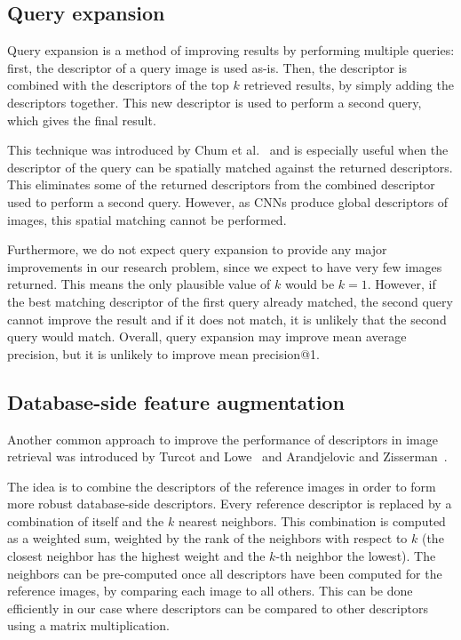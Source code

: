 \subsection{Query expansion}
Query expansion is a method of improving results by performing
multiple queries: first, the
descriptor of a query image is used as-is. Then, the descriptor
is combined with the descriptors of the top $k$ retrieved
results, by simply adding the descriptors together. This new
descriptor is used to perform a second query, which gives
the final result.

This technique was introduced by
Chum et al.~\cite{chum_total_2007} and is especially useful
when the descriptor of the query can be spatially matched
against the returned descriptors. This eliminates some of the
returned descriptors from the combined descriptor used
to perform a second query. However, as CNNs produce
global descriptors of images, this spatial matching cannot
be performed.

Furthermore, we do not expect query expansion to provide
any major improvements in our research problem, since
we expect to have very few images returned. This means
the only plausible value of $k$ would be $k=1$. However,
if the best matching descriptor of the first query already
matched, the second query cannot improve the result
and if it does not match, it is unlikely that the second
query would match. Overall, query expansion may
improve mean average precision, but it is unlikely to
improve mean precision@1.

\subsection{Database-side feature augmentation}
Another common approach to improve the performance of descriptors
in image retrieval was introduced
by Turcot and Lowe~\cite{turcot_better_2009} and
Arandjelovic and Zisserman~\cite{arandjelovic_three_2012}.

The idea is to combine the descriptors of the reference
images in order to form more robust database-side descriptors.
Every reference descriptor is replaced by a
combination of itself and the $k$ nearest neighbors.
This combination is computed as a weighted sum, weighted
by the rank of the neighbors with respect to $k$ (the
closest neighbor has the highest weight and the $k$-th
neighbor the lowest).
The neighbors can be pre-computed once all descriptors
have been computed for the reference images, by comparing
each image to all others. This can be done efficiently
in our case where descriptors can be compared to other
descriptors using a matrix multiplication.

